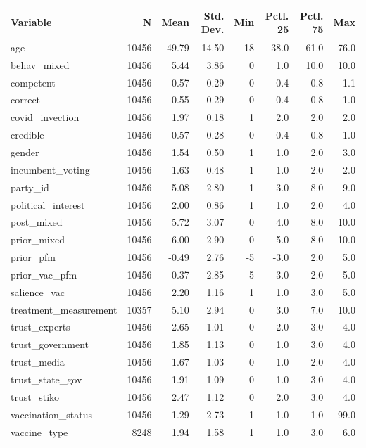 
\begin{tabular}{lrrrrrrr}
\toprule
Variable & N & Mean & Std. Dev. & Min & Pctl. 25 & Pctl. 75 & Max\\
\midrule
age & 10456 & 49.79 & 14.50 & 18 & 38.0 & 61.0 & 76.0\\
behav\_mixed & 10456 & 5.44 & 3.86 & 0 & 1.0 & 10.0 & 10.0\\
competent & 10456 & 0.57 & 0.29 & 0 & 0.4 & 0.8 & 1.1\\
correct & 10456 & 0.55 & 0.29 & 0 & 0.4 & 0.8 & 1.0\\
covid\_invection & 10456 & 1.97 & 0.18 & 1 & 2.0 & 2.0 & 2.0\\
\addlinespace
credible & 10456 & 0.57 & 0.28 & 0 & 0.4 & 0.8 & 1.0\\
gender & 10456 & 1.54 & 0.50 & 1 & 1.0 & 2.0 & 3.0\\
incumbent\_voting & 10456 & 1.63 & 0.48 & 1 & 1.0 & 2.0 & 2.0\\
party\_id & 10456 & 5.08 & 2.80 & 1 & 3.0 & 8.0 & 9.0\\
political\_interest & 10456 & 2.00 & 0.86 & 1 & 1.0 & 2.0 & 4.0\\
\addlinespace
post\_mixed & 10456 & 5.72 & 3.07 & 0 & 4.0 & 8.0 & 10.0\\
prior\_mixed & 10456 & 6.00 & 2.90 & 0 & 5.0 & 8.0 & 10.0\\
prior\_pfm & 10456 & -0.49 & 2.76 & -5 & -3.0 & 2.0 & 5.0\\
prior\_vac\_pfm & 10456 & -0.37 & 2.85 & -5 & -3.0 & 2.0 & 5.0\\
salience\_vac & 10456 & 2.20 & 1.16 & 1 & 1.0 & 3.0 & 5.0\\
\addlinespace
treatment\_measurement & 10357 & 5.10 & 2.94 & 0 & 3.0 & 7.0 & 10.0\\
trust\_experts & 10456 & 2.65 & 1.01 & 0 & 2.0 & 3.0 & 4.0\\
trust\_government & 10456 & 1.85 & 1.13 & 0 & 1.0 & 3.0 & 4.0\\
trust\_media & 10456 & 1.67 & 1.03 & 0 & 1.0 & 2.0 & 4.0\\
trust\_state\_gov & 10456 & 1.91 & 1.09 & 0 & 1.0 & 3.0 & 4.0\\
\addlinespace
trust\_stiko & 10456 & 2.47 & 1.12 & 0 & 2.0 & 3.0 & 4.0\\
vaccination\_status & 10456 & 1.29 & 2.73 & 1 & 1.0 & 1.0 & 99.0\\
vaccine\_type & 8248 & 1.94 & 1.58 & 1 & 1.0 & 3.0 & 6.0\\
\bottomrule
\end{tabular}
